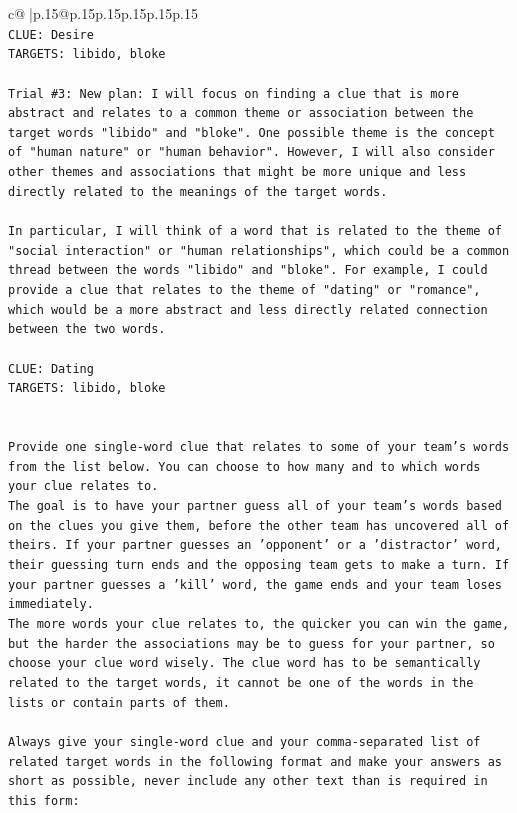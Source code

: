 \documentclass{article}
\begin{document}
{\begin{supertabular}{c@{$\;$}|p{.15\linewidth}@{}p{.15\linewidth}p{.15\linewidth}p{.15\linewidth}p{.15\linewidth}p{.15\linewidth}}
{{{\\ 
\texttt{CLUE: Desire} \\
\texttt{TARGETS: libido, bloke} \\
\\ 
\texttt{Trial \#3: New plan: I will focus on finding a clue that is more abstract and relates to a common theme or association between the target words "libido" and "bloke". One possible theme is the concept of "human nature" or "human behavior". However, I will also consider other themes and associations that might be more unique and less directly related to the meanings of the target words. } \\
\\ 
\texttt{In particular, I will think of a word that is related to the theme of "social interaction" or "human relationships", which could be a common thread between the words "libido" and "bloke". For example, I could provide a clue that relates to the theme of "dating" or "romance", which would be a more abstract and less directly related connection between the two words. } \\
\\ 
\texttt{CLUE: Dating} \\
\texttt{TARGETS: libido, bloke} \\
\\ 
\\ 
\texttt{Provide one single{-}word clue that relates to some of your team's words from the list below. You can choose to how many and to which words your clue relates to.} \\
\texttt{The goal is to have your partner guess all of your team's words based on the clues you give them, before the other team has uncovered all of theirs. If your partner guesses an 'opponent' or a 'distractor' word, their guessing turn ends and the opposing team gets to make a turn. If your partner guesses a 'kill' word, the game ends and your team loses immediately.} \\
\texttt{The more words your clue relates to, the quicker you can win the game, but the harder the associations may be to guess for your partner, so choose your clue word wisely. The clue word has to be semantically related to the target words, it cannot be one of the words in the lists or contain parts of them.} \\
\\ 
\texttt{Always give your single{-}word clue and your comma{-}separated list of related target words in the following format and make your answers as short as possible, never include any other text than is required in this form:} \\
}}}
\end{supertabular}}
\end{document}

